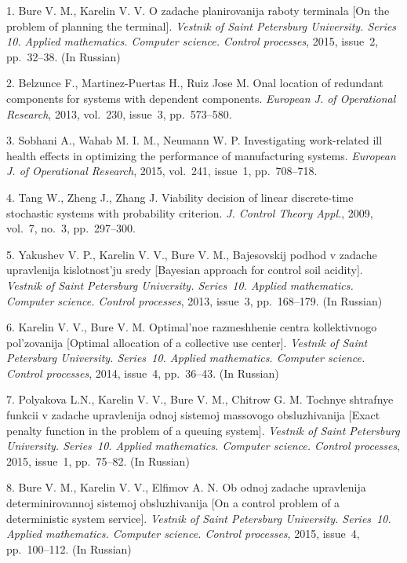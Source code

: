 

{\footnotesize

\vskip 3mm


\vskip 2mm

1.  Bure V. M., Karelin V. V. O zadache planirovanija raboty
terminala [On the problem of planning the terminal]. {\it Vestnik
of Saint Petersburg University. Series 10. Applied mathematics.
Computer science. Control processes}, 2015,  issue~2, pp.~32--38.
(In Russian)

2.  Belzunce F., Martinez-Puertas H.,  Ruiz Jose M.  Onal location
of redundant components for systems with dependent components.
{\it European J. of Operational Research}, 2013, vol.~230,
issue~3, pp.~573--580.

3.   Sobhani A.,  Wahab M. I. M., Neumann W. P.   Investigating
work-related ill health effects in optimizing the performance of
manufacturing systems. {\it European J. of Operational Research},
2015, vol.~241, issue~1, pp.~708--718.

4.  Tang W., Zheng J., Zhang J.   Viability decision  of linear
discrete-time stochastic  systems with probability criterion. {\it
J. Control Theory  Appl.},  2009, vol.~7,  no.~3, pp.~297--300.

5. Yakushev V. P., Karelin V. V., Bure V. M., Bajesovskij podhod v
zadache upravlenija kislotnost'ju sredy  [Bayesian approach for
control soil acidity].  {\it Vestnik of Saint Petersburg
University. Series~10. Applied mathematics. Computer science.
Control processes},  2013,  issue~3, pp.~168--179.  (In Russian)

6. Karelin V. V., Bure V. M.  Optimal'noe razmeshhenie centra
kollektivnogo pol'zovanija  [Optimal allocation of a collective
use center].  {\it Vestnik of Saint Petersburg University.
Series~10. Applied mathematics. Computer science. Control
processes},  2014,  issue~4, pp.~36--43. (In Russian)

7.  Polyakova L.N., Karelin V. V., Bure V. M., Chitrow G. M.
Tochnye shtrafnye funkcii v zadache upravlenija odnoj sistemoj
massovogo obsluzhivanija  [Exact penalty function in the problem
of a queuing system].  {\it Vestnik of Saint Petersburg
University. Series~10. Applied mathematics. Computer science.
Control processes},  2015,  issue~1, pp.~75--82.  (In Russian)

8.  Bure V. M., Karelin V. V.,  Elfimov A. N.  Ob odnoj zadache
upravlenija determinirovannoj sistemoj obsluzhivanija [On a
control problem of a deterministic system service]. {\it Vestnik
of Saint Petersburg University. Series~10. Applied mathematics.
Computer science. Control processes},  2015, issue~4,
pp.~100--112. (In Russian)

}
